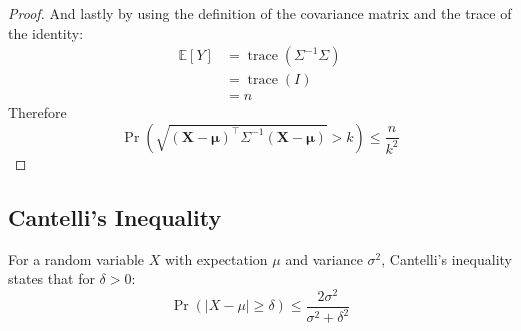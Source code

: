 \documentclass[11pt]{report} %
\begin{document}
\begin{proof}
And lastly by using the definition of the covariance matrix and the trace of the identity:
\begin{align}
\mathbb{E}\left[Y\right] &= \operatorname{trace}\left(\Sigma^{-1}\Sigma\right) \\
&= \operatorname{trace}\left(I\right) \\
&= n
\end{align}
Therefore
\begin{equation}
\operatorname{Pr}\left(\sqrt{\left(\mathbf{X} - \boldsymbol{\mu}\right)^{\top}\Sigma^{-1}\left(\mathbf{X} - \boldsymbol{\mu}\right)} > k\right) \leq \dfrac{n}{k^{2}}
\end{equation}
\end{proof}

\subsection{Cantelli's Inequality}
For a random variable $X$ with expectation $\mu$ and variance $\sigma^{2}$, Cantelli's inequality states that for $\delta > 0$:
\begin{equation}
\operatorname{Pr}\left(\left|X - \mu\right| \geq \delta\right) \leq  \dfrac{2\sigma^{2}}{\sigma^{2} + \delta^{2}}
\end{equation}
\end{document}
